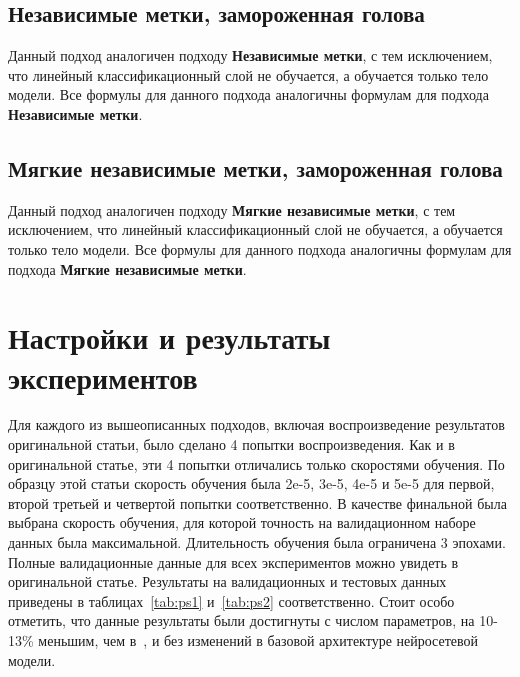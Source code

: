 \subsection{Независимые метки, замороженная голова}\label{subch:pseudolabel/sect3/sub7}

Данный подход аналогичен подходу \textbf{Независимые метки}, с тем исключением, что линейный классификационный слой не обучается, а обучается только тело модели. Все формулы для данного подхода аналогичны формулам для подхода \textbf{Независимые метки}.

\subsection{Мягкие независимые метки, замороженная голова}\label{subch:pseudolabel/sect3/sub8}

Данный подход аналогичен подходу \textbf{Мягкие независимые метки}, с тем исключением, что линейный классификационный слой не обучается, а обучается только тело модели. Все формулы для данного подхода аналогичны формулам для подхода \textbf{Мягкие независимые метки}.
\section{Настройки и результаты экспериментов}\label{ch:pseudolabel/sect4}

Для каждого из вышеописанных подходов, включая воспроизведение результатов оригинальной статьи, было сделано 4 попытки воспроизведения. Как и в оригинальной статье, эти 4 попытки отличались только скоростями обучения. По образцу этой статьи скорость обучения была 2e-5, 3e-5, 4e-5 и 5e-5 для первой, второй третьей и четвертой попытки соответственно. В качестве финальной была выбрана скорость обучения, для которой точность на валидационном наборе данных была максимальной. Длительность обучения была ограничена 3 эпохами. Полные валидационные данные для всех экспериментов можно увидеть в оригинальной статье.
Результаты на валидационных и тестовых данных приведены в таблицах~\ref{tab:ps1} и~\ref{tab:ps2} соответственно. Стоит особо отметить, что данные результаты были достигнуты с числом параметров, на 10-13\% меньшим, чем в~\cite{stickland_2019}, и без изменений в базовой архитектуре нейросетевой модели.

